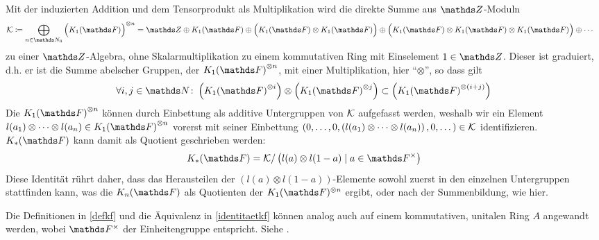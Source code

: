 \documentclass[ngerman,fontsize=11pt, paper=a4, parskip=half, titlepage=true, toc=bib]{scrartcl}
\begin{document}
\begin{Bem}\label{identitaetkf}
  Mit der induzierten Addition und dem Tensorprodukt als
  Multiplikation wird die direkte Summe aus $\Z$-Moduln
  \begin{align*}
    \calK &\coloneqq
            \bigoplus_{n\in\N_0}{\Big(\K_1(\F)\Big)}^{\otimes n}%
                = \Z\oplus\K_1(\F)
                \oplus\Big(\K_1(\F)\otimes\K_1(\F)\Big)
                \oplus\Big(\K_1(\F)\otimes\K_1(\F)\otimes\K_1(\F)\Big)
                \oplus\dotsb
  \end{align*}
  zu einer $\Z$-Algebra, 
  ohne Skalarmultiplikation zu einem kommutativen Ring mit Einselement
  $1\in\Z$.
  Dieser ist graduiert, d.h. er ist die Summe abelscher Gruppen, 
  der ${\K_1(\F)}^{\otimes n}$, mit einer Multiplikation, hier
  \enquote{$\otimes$}, so dass gilt
  \begin{gather*}
    \forall i,j\in \N\colon 
    \left( {\K_1(\F)}^{\otimes i} \right) \otimes
    \left( {\K_1(\F)}^{\otimes j} \right)
    \subset \left( {\K_1(\F)}^{\otimes (i+j)} \right)
  \end{gather*}
  Die ${\KoF}^{\otimes n}$ können durch Einbettung als additive 
  Untergruppen von $\mathcal{K}$ aufgefasst
  werden, weshalb wir ein Element
  $l(a_1)\otimes\dotsb\otimes l(a_n)\in {\KoF}^{\otimes n}$
  vorerst mit seiner Einbettung
  $\left(
    0,\dotsc,0,
    \left(l(a_1)\otimes\dotsb\otimes l(a_n)\right),
    0,\dotsc
  \right)\in\mathcal{K}$
  identifizieren.
  $\KF$ kann damit als Quotient geschrieben werden:
  \begin{gather*}
    \KF = \calK / \left(l(a)\otimes l(1-a)\mid a\in\Fx\right)
  \end{gather*}
  Diese Identität rührt daher, dass das Herausteilen 
  der $(l(a)\otimes l(1-a))$-Elemente sowohl zuerst in den einzelnen
  Untergruppen stattfinden kann, was die $\KnF$ als Quotienten der
  $\KoF^{\otimes n}$ ergibt, 
  oder nach der Summenbildung, wie hier.
\end{Bem}

\begin{Bem}
  Die Definitionen in \ref{defkf} und die Äquivalenz in 
  \ref{identitaetkf} können analog auch auf 
  einem kommutativen, unitalen Ring $A$ angewandt werden,
  wobei $\Fx$ der Einheitengruppe entspricht. Siehe \cite{kerzdipl,kerz}.
\end{Bem}
\end{document}
